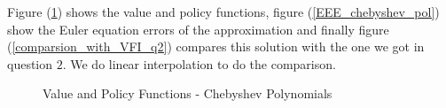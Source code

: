 \documentclass[a4paper,12pt]{article}
\begin{document}
    Figure (\ref{value_and_policy_function_chebyshev}) shows the value and policy functions, figure (\ref{EEE_chebyshev_pol}) show the Euler equation errors of the approximation and finally figure (\ref{comparsion_with_VFI_q2}) compares this solution with the one we got in question $2$. We do linear interpolation to do the comparison. 

    \begin{figure}[!htbp]
        \centering
       \caption{Value and Policy Functions - Chebyshev Polynomials}
       \label{value_and_policy_function_chebyshev}
   \end{figure}
   
\end{document}
